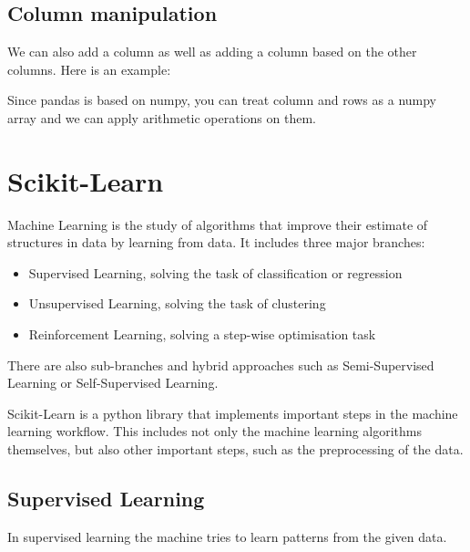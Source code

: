 \documentclass[10pt,a4paper]{article}
\begin{document}
\subsection{Column manipulation}
We can also add a column as well as adding a column based on the other columns. Here is an example:

Since pandas is based on numpy, you can treat column and rows as a numpy array and we can apply arithmetic operations on them.






















\section{Scikit-Learn}
Machine Learning is the study of algorithms that improve their estimate of structures in data by learning from data. It includes three major branches:
\begin{itemize}
\item Supervised Learning, solving the task of classification or regression
\item Unsupervised Learning, solving the task of clustering
\item Reinforcement Learning, solving a step-wise optimisation task
\end{itemize}
There are also sub-branches and hybrid approaches such as Semi-Supervised Learning or Self-Supervised Learning.

Scikit-Learn is a python library that implements important steps in the machine learning workflow. This includes not only the machine learning algorithms themselves, but also other important steps, such as the preprocessing of the data.



\subsection{Supervised Learning}
In supervised learning the machine tries to learn patterns from the given data.
\end{document}
